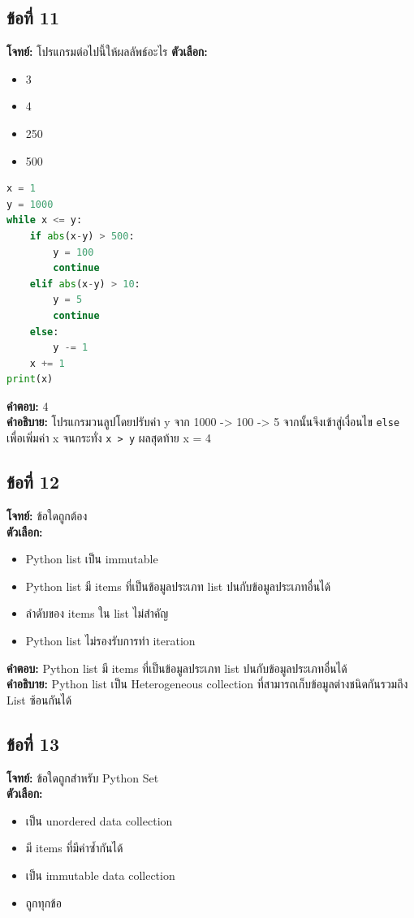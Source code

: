 \documentclass[12pt]{article}
\begin{document}
\subsection*{ข้อที่ 11}
\textbf{โจทย์:} โปรแกรมต่อไปนี้ให้ผลลัพธ์อะไร
\textbf{ตัวเลือก:}
\begin{itemize}
    \item 3
    \item 4
    \item 250
    \item 500
\end{itemize}
\begin{lstlisting}[language=Python]
x = 1
y = 1000
while x <= y:
    if abs(x-y) > 500:
        y = 100
        continue
    elif abs(x-y) > 10:
        y = 5
        continue
    else:
        y -= 1
    x += 1
print(x)
\end{lstlisting}
\textbf{คำตอบ:} 4\\
\textbf{คำอธิบาย:} โปรแกรมวนลูปโดยปรับค่า y จาก 1000 -> 100 -> 5 จากนั้นจึงเข้าสู่เงื่อนไข \texttt{else} เพื่อเพิ่มค่า x จนกระทั่ง \texttt{x > y} ผลสุดท้าย x = 4

\subsection*{ข้อที่ 12}
\textbf{โจทย์:} ข้อใดถูกต้อง\\
\textbf{ตัวเลือก:}
\begin{itemize}
    \item Python list เป็น immutable
    \item Python list มี items ที่เป็นข้อมูลประเภท list ปนกับข้อมูลประเภทอื่นได้
    \item ลำดับของ items ใน list ไม่สำคัญ
    \item Python list ไม่รองรับการทำ iteration
\end{itemize}

\textbf{คำตอบ:} Python list มี items ที่เป็นข้อมูลประเภท list ปนกับข้อมูลประเภทอื่นได้\\
\textbf{คำอธิบาย:} Python list เป็น Heterogeneous collection ที่สามารถเก็บข้อมูลต่างชนิดกันรวมถึง List ซ้อนกันได้

\subsection*{ข้อที่ 13}
\textbf{โจทย์:} ข้อใดถูกสำหรับ Python Set\\
\textbf{ตัวเลือก:}
\begin{itemize}
    \item เป็น unordered data collection
    \item มี items ที่มีค่าซ้ำกันได้
    \item เป็น immutable data collection
    \item ถูกทุกข้อ
\end{itemize}
\end{document}
